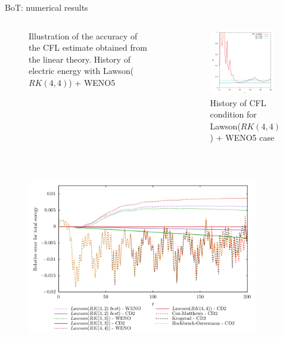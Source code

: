 \documentclass{beamer}
\begin{document}
\begin{frame}{BoT: numerical results}
{\begin{columns}
\begin{column}{0.5\textwidth}
\begin{figure}
          \caption{Illustration of the accuracy of the CFL estimate obtained from the linear theory. History of electric energy with Lawson($RK(4,4)$) + WENO5}
        \end{figure}
        \vfill
        \ 
      \end{column}
      \begin{column}{0.5\textwidth}
        \begin{figure}
          \includegraphics[width=0.9\textwidth]{img/bot_cfl_weno_rk44.png}
          \caption{History of CFL condition for Lawson($RK(4,4)$) + WENO5 case}
        \end{figure}
        \vfill
        \ 
      \end{column}
    \end{columns}
  }  {
    \begin{figure}
      \includegraphics[width=0.9\textwidth]{img/H.png}
    \end{figure}
  }
\end{frame}
\end{document}

